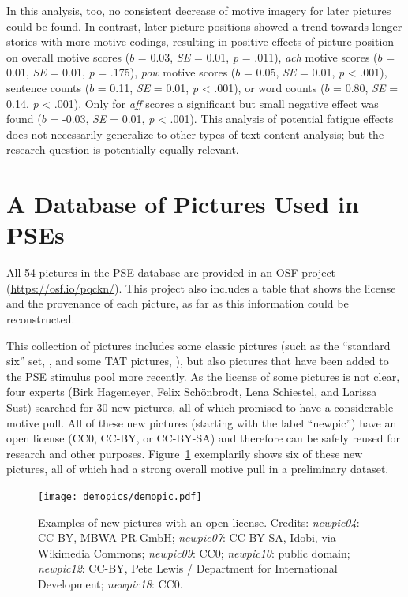 \documentclass[man,a4paper,mask]{apa6}\usepackage[]{graphicx}\usepackage[]{color}
\begin{document}
In this analysis, too, no consistent decrease of motive imagery for later pictures could be found. In contrast, later picture positions showed a trend towards longer stories with more motive codings, resulting in positive effects of picture position on overall motive scores ($b$ = 0.03, \emph{SE} = 0.01, \emph{p} = .011), \emph{ach} motive scores ($b$ = 0.01, \emph{SE} = 0.01, \emph{p} = .175), \emph{pow} motive scores ($b$ = 0.05, \emph{SE} = 0.01, \emph{p} < .001), sentence counts ($b$ = 0.11, \emph{SE} = 0.01, \emph{p} < .001), or word counts ($b$ = 0.80, \emph{SE} = 0.14, \emph{p} < .001). Only for \emph{aff} scores a significant but small negative effect was found ($b$ = -0.03, \emph{SE} = 0.01, \emph{p} < .001). This analysis of potential fatigue effects does not necessarily generalize to other types of text content analysis; but the research question is potentially equally relevant.

\section{A Database of Pictures Used in PSEs}

All 54 pictures in the PSE database are provided in an OSF project (\url{https://osf.io/pqckn/}). This project also includes a table that shows the license and the provenance of each picture, as far as this information could be reconstructed. 

This collection of pictures includes some classic pictures (such as the ``standard six'' set, , and some TAT pictures, ), but also pictures that have been added to the PSE stimulus pool more recently. As the license of some pictures is not clear, four experts (Birk Hagemeyer, Felix Schönbrodt, Lena Schiestel, and Larissa Sust) searched for 30 new pictures, all of which promised to have a considerable motive pull. All of these new pictures (starting with the label ``newpic'') have an open license (CC0, CC-BY, or CC-BY-SA) and therefore can be safely reused for research and other purposes. Figure~\ref{fig:demopic} exemplarily shows six of these new pictures, all of which had a strong overall motive pull in a preliminary dataset.


\begin{figure}[htp]
  \begin{center}
	\texttt{[image: demopics/demopic.pdf]}
  \end{center}
  \caption{Examples of new pictures with an open license. Credits: \emph{newpic04}: CC-BY, MBWA PR GmbH; \emph{newpic07}: CC-BY-SA, Idobi, via Wikimedia Commons; \emph{newpic09}: CC0; \emph{newpic10}: public domain; \emph{newpic12}: CC-BY, Pete Lewis / Department for International Development; \emph{newpic18}: CC0.}
  \label{fig:demopic}
\end{figure}
\end{document}
